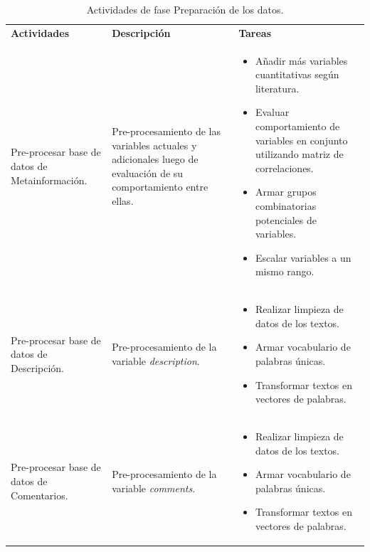 \begin{longtable}{|M{5cm}|M{5cm}|M{5cm}|}
	\caption[Actividades de fase Preparación de los datos]{Actividades de fase Preparación de los datos.}
	\label{3:table5}
	\newcommand{\multirot}[1]{\multirow{2}{*}[-8ex]{\rotcell{\rlap{#1}}}}
	\footnotesize
	\centering
	\small
	\tabularnewline\hline
	\textbf{Actividades} & \textbf{Descripción} & \textbf{Tareas}
	\\
	\hline
	Pre-procesar base de datos de Metainformación.
	& Pre-procesamiento de las variables actuales y adicionales luego de evaluación de su comportamiento entre ellas.
	& 
	\begin{itemize}[noitemsep,leftmargin=*]
		\item Añadir más variables cuantitativas según literatura.
		\item Evaluar comportamiento de variables en conjunto utilizando matriz de correlaciones.
		\item Armar grupos combinatorias potenciales de variables.
		\item Escalar variables a un mismo rango.
	\end{itemize}                                             
	\\
	\hline
	Pre-procesar base de datos de Descripción.
	& Pre-procesamiento de la variable \textit{description}.
	& 
	\begin{itemize}[noitemsep,leftmargin=*]
		\item Realizar limpieza de datos de los textos.
		\item Armar vocabulario de palabras únicas.
		\item Transformar textos en vectores de palabras.
	\end{itemize} 
	\\
	\hline
	Pre-procesar base de datos de Comentarios.
	& Pre-procesamiento de la variable \textit{comments}.
	& 
	\begin{itemize}[noitemsep,leftmargin=*]
		\item Realizar limpieza de datos de los textos.
		\item Armar vocabulario de palabras únicas.
		\item Transformar textos en vectores de palabras.
	\end{itemize}
	\\
	\hline
\end{longtable}%

